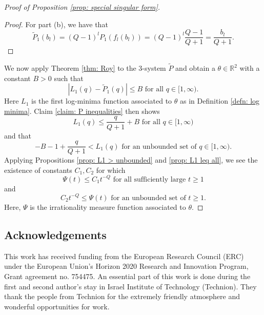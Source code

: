 \documentclass[reqno,11pt, twoside]{amsart}
\theoremstyle{plain}
\theoremstyle{definition}
\theoremstyle{definition}
\theoremstyle{remark}
\numberwithin{equation}{section}
\newcommand{\R}{{\mathbb{R}}}
\begin{document}
\begin{proof}[Proof of Proposition \ref{prop: special singular form}]
\begin{proof}
        For part (b), we have that 
        \begin{equation*}
            \widetilde{P}_{1}(b_l) = (Q-1)^lP_1(f_l(b_l)) = (Q-1)^l \frac{Q-1}{Q+1} = \frac{b_l}{Q+1}.
        \end{equation*}
    \end{proof}
We now apply Theorem \ref{thm: Roy} to the $3$-system $\widetilde{P}$ and obtain a $\theta \in \R^2$ with a constant $B >0$ such that
\begin{equation*}
    |L_1(q) - \widetilde{P}_1(q)| \leq B \text{ for all } q \in [1,\infty).
\end{equation*}
Here $L_1$ is the first log-minima function associated to $\theta$ as in Definition \ref{defn: log minima}. 
Claim \ref{claim: P inequalities} then shows
\begin{equation*}
    L_1(q) \leq \frac{q}{Q+1} + B \text{ for all } q \in [1,\infty)
\end{equation*}
and that 
\begin{equation*}
    -B -1 + \frac{q}{Q+1} < L_1(q) \text{ for an unbounded set of } q \in [1,\infty).
\end{equation*}
Applying Propositions \ref{prop: L1 > unbounded} and \ref{prop: L1 leq all}, we see the existence of constants $C_1, C_2$ for which
\begin{equation*}
    \Psi(t) \leq C_1 t^{-Q} \text{ for all sufficiently large } t\geq 1 
\end{equation*}
and \begin{equation*}
    C_2 t^{-Q} \leq \Psi(t) \text{ for an unbounded set of } t \geq 1.
\end{equation*}
Here, $\Psi$ is the irrationality measure function associated to $\theta$.
\end{proof}

\subsection*{Acknowledgements}
This work has received funding from the European Research Council (ERC) under the European Union’s Horizon 2020 Research and Innovation Program, Grant agreement no. 754475.
An essential part of this work is done during the first and second author's stay in Israel Institute of Technology (Technion). They thank the people from Technion for the extremely friendly atmosphere and wonderful opportunities for work.
\end{document}

